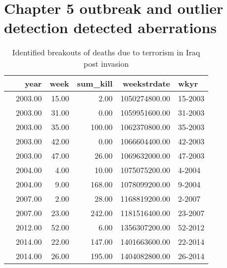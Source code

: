 \chapter{Chapter 5 outbreak and outlier detection detected aberrations}

\begin{table}[ht]
\centering
\begin{tabular}{rrrrrl}
  \hline
 & year & week & sum\_kill & weekstrdate & wkyr \\ 
  \hline
 & 2003.00 & 15.00 & 2.00 & 1050274800.00 & 15-2003 \\ 
 & 2003.00 & 31.00 & 0.00 & 1059951600.00 & 31-2003 \\ 
 & 2003.00 & 35.00 & 100.00 & 1062370800.00 & 35-2003 \\ 
 & 2003.00 & 42.00 & 0.00 & 1066604400.00 & 42-2003 \\ 
 & 2003.00 & 47.00 & 26.00 & 1069632000.00 & 47-2003 \\ 
 & 2004.00 & 4.00 & 10.00 & 1075075200.00 & 4-2004 \\ 
 & 2004.00 & 9.00 & 168.00 & 1078099200.00 & 9-2004 \\ 
 & 2007.00 & 2.00 & 28.00 & 1168819200.00 & 2-2007 \\ 
 & 2007.00 & 23.00 & 242.00 & 1181516400.00 & 23-2007 \\ 
 & 2012.00 & 52.00 & 6.00 & 1356307200.00 & 52-2012 \\ 
 & 2014.00 & 22.00 & 147.00 & 1401663600.00 & 22-2014 \\ 
 & 2014.00 & 26.00 & 195.00 & 1404082800.00 & 26-2014 \\ 
   \hline
\end{tabular}
\caption{Identified breakouts of deaths due to terrorism in Iraq post invasion}
\label{tab:labelsiraq} 
\end{table}


